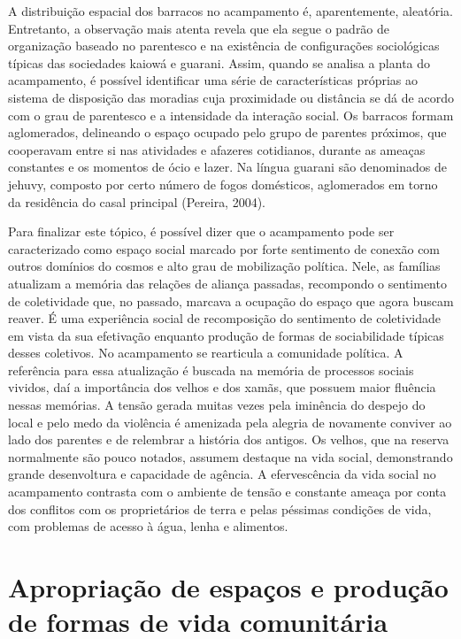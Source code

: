 A distribuição espacial dos barracos no acampamento é, aparentemente,
aleatória. Entretanto, a observação mais atenta revela que ela segue o
padrão de organização baseado no parentesco e na existência de
configurações sociológicas típicas das sociedades kaiowá e guarani.
Assim, quando se analisa a planta do acampamento, é possível
identificar uma série de características próprias ao sistema de
disposição das moradias cuja proximidade ou distância se dá de acordo
com o grau de parentesco e a intensidade da interação social. Os
barracos formam aglomerados, delineando o espaço ocupado pelo grupo de
parentes próximos, que cooperavam entre si nas atividades e afazeres
cotidianos, durante as ameaças constantes e os momentos de ócio e
lazer. Na língua guarani são denominados de jehuvy, composto por certo
número de fogos domésticos, aglomerados em torno da residência do casal
principal (Pereira, 2004).

Para finalizar este tópico, é possível dizer que o acampamento pode ser
caracterizado como espaço social marcado por forte sentimento de
conexão com outros domínios do cosmos e alto grau de mobilização
política. Nele, as famílias atualizam a memória das relações de aliança
passadas, recompondo o sentimento de coletividade que, no passado,
marcava a ocupação do espaço que agora buscam reaver. É uma experiência
social de recomposição do sentimento de coletividade em vista da sua
efetivação enquanto produção de formas de sociabilidade típicas desses
coletivos. No acampamento se rearticula a comunidade política. A
referência para essa atualização é buscada na memória de processos
sociais vividos, daí a importância dos velhos e dos xamãs, que possuem
maior fluência nessas memórias. A tensão gerada muitas vezes pela
iminência do despejo do local e pelo medo da violência é amenizada pela
alegria de novamente conviver ao lado dos parentes e de relembrar a
história dos antigos. Os velhos, que na reserva normalmente são pouco
notados, assumem destaque na vida social, demonstrando grande
desenvoltura e capacidade de agência. A efervescência da vida social no
acampamento contrasta com o ambiente de tensão e constante ameaça por
conta dos conflitos com os proprietários de terra e pelas péssimas
condições de vida, com problemas de acesso à água, lenha e alimentos. 

\section{Apropriação de espaços e produção de formas de vida comunitária}

